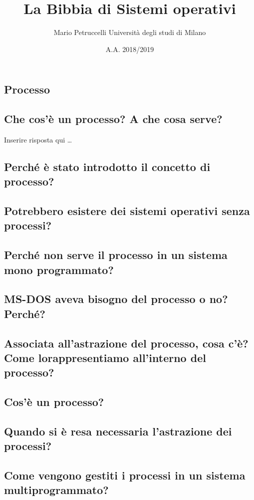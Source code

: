 \documentclass[12pt, letterpaper]{article}
\title{La Bibbia di Sistemi operativi}
\author{Mario Petruccelli \cr Università degli studi di Milano}
\date{A.A. 2018/2019}
\begin{document}
\begin{titlepage}
\maketitle
\newpage
\tableofcontents
\newpage

\section{Processo} 
	\subsection{Che cos’è un processo? A che cosa serve?}
		Inserire risposta qui \dots
	\subsection{Perché è stato introdotto il concetto di processo?}
	\subsection{Potrebbero esistere dei sistemi operativi senza processi?}
	\subsection{Perché non serve il processo in un sistema mono programmato?}
	\subsection{MS-DOS aveva bisogno del processo o no? Perché?}
	\subsection{Associata all’astrazione del processo, cosa c’è? Come lorappresentiamo  all’interno  del  processo?}
	\subsection{Cos’è  un  processo?}
	\subsection{Quando  si  è  resa  necessaria  l’astrazione  dei  processi?}
	\subsection{Come vengono gestiti i processi  in  un  sistema  multiprogrammato?} 


\end{titlepage}
\end{document}
